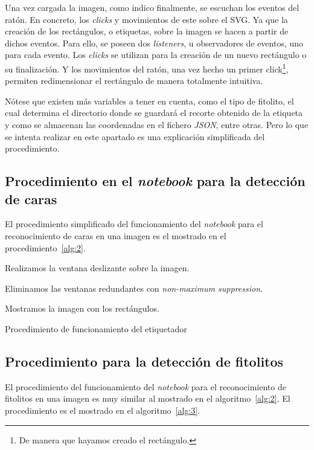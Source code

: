 Una vez cargada la imagen, como indico finalmente, se escuchan los eventos del ratón. En concreto, los \textit{clicks} y movimientos de este sobre el SVG. Ya que la creación de los rectángulos, o etiquetas, sobre la imagen se hacen a partir de dichos eventos. Para ello, se poseen dos \textit{listeners}, u observadores de eventos, uno para cada evento. Los \textit{clicks} se utilizan para la creación de un nuevo rectángulo o su finalización. Y los movimientos del ratón, una vez hecho un primer click\footnote{De manera que hayamos creado el rectángulo.}, permiten redimensionar el rectángulo de manera totalmente intuitiva.

Nótese que existen más variables a tener en cuenta, como el tipo de fitolito, el cual determina el directorio donde se guardará el recorte obtenido de la etiqueta y como se almacenan las coordenadas en el fichero \textit{JSON}, entre otras. Pero lo que se intenta realizar en este apartado es una explicación simplificada del procedimiento.

\subsection{Procedimiento en el \textit{notebook} para la detección de caras}

El procedimiento simplificado del funcionamiento del \textit{notebook} para el reconocimiento de caras en una imagen es el mostrado en el procedimiento~\ref{alg:2}.

\begin{algorithm}
    Realizamos la ventana deslizante sobre la imagen.    
    
    
    Eliminamos las ventanas redundantes con \textit{non-maximum suppression}.

    Mostramos la imagen con los rectángulos.
    \caption{Procedimiento de funcionamiento del etiquetador}
    \label{alg:2}
\end{algorithm}

\subsection{Procedimiento para la detección de fitolitos}

El procedimiento del funcionamiento del \textit{notebook} para el reconocimiento de fitolitos en una imagen es muy similar al mostrado en el algoritmo~\ref{alg:2}. El procedimiento es el mostrado en el algoritmo~\ref{alg:3}.

